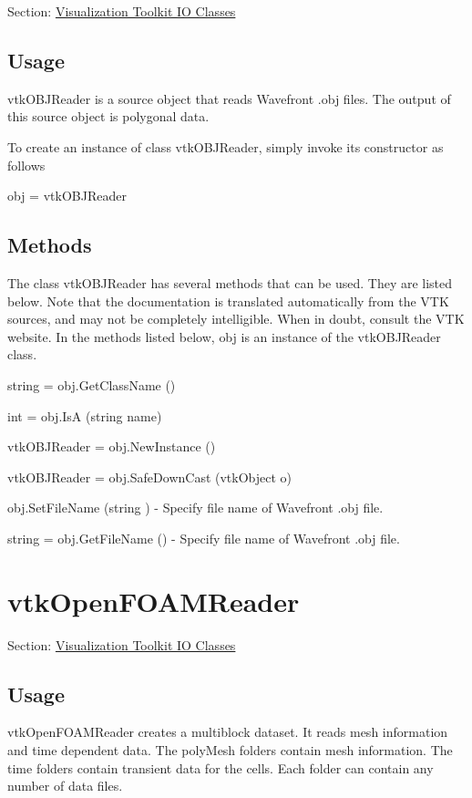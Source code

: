Section\-: \hyperlink{sec_vtkio}{Visualization Toolkit I\-O Classes} \hypertarget{vtkwidgets_vtkxyplotwidget_Usage}{}\subsection{Usage}\label{vtkwidgets_vtkxyplotwidget_Usage}
vtk\-O\-B\-J\-Reader is a source object that reads Wavefront .obj files. The output of this source object is polygonal data.

To create an instance of class vtk\-O\-B\-J\-Reader, simply invoke its constructor as follows \begin{DoxyVerb}  obj = vtkOBJReader
\end{DoxyVerb}
 \hypertarget{vtkwidgets_vtkxyplotwidget_Methods}{}\subsection{Methods}\label{vtkwidgets_vtkxyplotwidget_Methods}
The class vtk\-O\-B\-J\-Reader has several methods that can be used. They are listed below. Note that the documentation is translated automatically from the V\-T\-K sources, and may not be completely intelligible. When in doubt, consult the V\-T\-K website. In the methods listed below, {\ttfamily obj} is an instance of the vtk\-O\-B\-J\-Reader class. 
\begin{DoxyItemize}
\item {\ttfamily string = obj.\-Get\-Class\-Name ()}  
\item {\ttfamily int = obj.\-Is\-A (string name)}  
\item {\ttfamily vtk\-O\-B\-J\-Reader = obj.\-New\-Instance ()}  
\item {\ttfamily vtk\-O\-B\-J\-Reader = obj.\-Safe\-Down\-Cast (vtk\-Object o)}  
\item {\ttfamily obj.\-Set\-File\-Name (string )} -\/ Specify file name of Wavefront .obj file.  
\item {\ttfamily string = obj.\-Get\-File\-Name ()} -\/ Specify file name of Wavefront .obj file.  
\end{DoxyItemize}\hypertarget{vtkio_vtkopenfoamreader}{}\section{vtk\-Open\-F\-O\-A\-M\-Reader}\label{vtkio_vtkopenfoamreader}
Section\-: \hyperlink{sec_vtkio}{Visualization Toolkit I\-O Classes} \hypertarget{vtkwidgets_vtkxyplotwidget_Usage}{}\subsection{Usage}\label{vtkwidgets_vtkxyplotwidget_Usage}
vtk\-Open\-F\-O\-A\-M\-Reader creates a multiblock dataset. It reads mesh information and time dependent data. The poly\-Mesh folders contain mesh information. The time folders contain transient data for the cells. Each folder can contain any number of data files.

